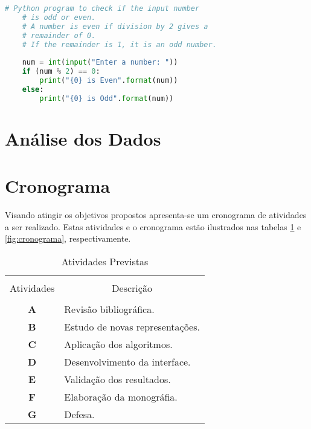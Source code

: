 \begin{lstlisting}[caption={Exemplo de código fonte}, language=Python, label=code:oddoreven]
	# Python program to check if the input number
	# is odd or even.
	# A number is even if division by 2 gives a
	# remainder of 0.
	# If the remainder is 1, it is an odd number.
	
	num = int(input("Enter a number: "))
	if (num % 2) == 0:
		print("{0} is Even".format(num))
	else:
		print("{0} is Odd".format(num))
\end{lstlisting}	


\section{Análise dos Dados}


\section{Cronograma}
Visando atingir os objetivos propostos apresenta-se um cronograma
de atividades a ser realizado. Estas atividades e o cronograma
estão ilustrados nas tabelas \ref{tb:atividades} e
\ref{fig:cronograma}, respectivamente.


\begin{table}[!htb]
	\centering
	\caption{Atividades Previstas}\label{tb:atividades}
	\begin{tabular}{cp{12cm}}
		\hline \hline &\\[-0.4cm]
		Atividades& \multicolumn{1}{c}{ Descrição} \\
		\hline
		&\\[-0.4cm]
		\textbf{A} & Revisão bibliográfica. \\[0.2cm]
		\textbf{B} &  Estudo de novas representações.\\[0.2cm]
		\textbf{C} &  Aplicação dos algoritmos.\\[0.2cm]
		\textbf{D} &  Desenvolvimento da interface. \\[0.2cm]
		\textbf{E} &  Validação dos resultados.\\[0.2cm]
		\textbf{F} &  Elaboração da monográfia.\\[0.2cm]
		\textbf{G} &  Defesa.\\[0.2cm]
		\hline \hline
	\end{tabular}
\end{table}


